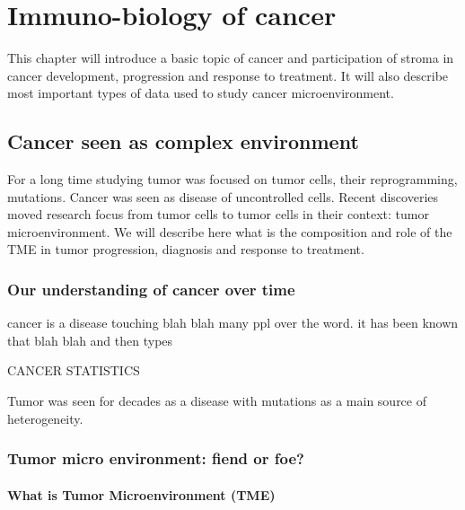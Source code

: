 \documentclass[12pt,]{book}
\theoremstyle{definition}
\theoremstyle{definition}
\theoremstyle{definition}
\theoremstyle{remark}
\begin{document}
{
\setcounter{tocdepth}{4}
\tableofcontents
}
\listoftables
\listoffigures
\hypertarget{intro}{%
\chapter{Immuno-biology of cancer}\label{intro}}

\setcounter{page}{11}

This chapter will introduce a basic topic of cancer and participation of
stroma in cancer development, progression and response to treatment. It
will also describe most important types of data used to study cancer
microenvironment.

\hypertarget{cancer-seen-as-complex-environment}{%
\section{Cancer seen as complex
environment}\label{cancer-seen-as-complex-environment}}

For a long time studying tumor was focused on tumor cells, their
reprogramming, mutations. Cancer was seen as disease of uncontrolled
cells. Recent discoveries moved research focus from tumor cells to tumor
cells in their context: tumor microenvironment. We will describe here
what is the composition and role of the TME in tumor progression,
diagnosis and response to treatment.

\hypertarget{our-understanding-of-cancer-over-time}{%
\subsection{Our understanding of cancer over
time}\label{our-understanding-of-cancer-over-time}}

cancer is a disease touching blah blah many ppl over the word. it has
been known that blah blah and then types

CANCER STATISTICS

Tumor was seen for decades as a disease with mutations as a main source
of heterogeneity.

\hypertarget{tumor-micro-environment-fiend-or-foe}{%
\subsection{Tumor micro environment: fiend or
foe?}\label{tumor-micro-environment-fiend-or-foe}}

\hypertarget{what-is-tumor-microenvironment-tme}{%
\subsubsection{What is Tumor Microenvironment
(TME)}\label{what-is-tumor-microenvironment-tme}}
\end{document}
